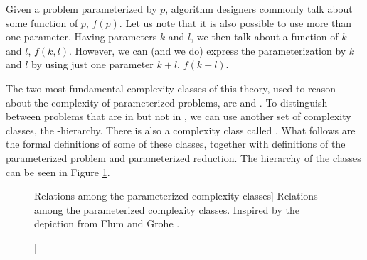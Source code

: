 Given a problem parameterized by $p$, algorithm designers commonly talk about some function of $p$, $f(p)$.
Let us note that it is also possible to use more than one parameter.
Having parameters $k$ and $l$, we then talk about a function of $k$ and $l$, $f(k,l)$.
However, we can (and we do) express the parameterization by $k$ and $l$ by using just one parameter $k+l$, $f(k+l)$.

The two most fundamental complexity classes of this theory, used to reason about the complexity of parameterized problems,
are \FPT and \XP.
To distinguish between \NPh problems that are in \XP but not in \FPT, we can use another set of complexity classes, the \W-hierarchy.
There is also a complexity class called \pNP.
What follows are the formal definitions of some of these classes, together with definitions of the parameterized problem
and parameterized reduction.
The hierarchy of the classes can be seen in Figure \ref{fig:complexityClasses}.


\begin{figure}[t]
    \centering
    \caption
    [Relations among the parameterized complexity classes]
    {
        Relations among the parameterized complexity classes.
        Inspired by the depiction from Flum and Grohe \cite[p.~97]{Flum2006}.
    }
    \label{fig:complexityClasses}
\end{figure}


